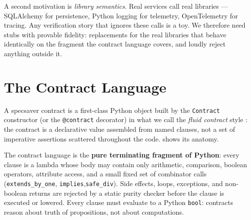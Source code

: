 \documentclass[11pt,a4paper]{article}
\begin{document}
A second motivation is \emph{library semantics}.  Real services call
real libraries --- SQLAlchemy for persistence, Python logging for
telemetry, OpenTelemetry for tracing.  Any verification story that
ignores these calls is a toy.  We therefore need stubs with provable
fidelity: replacements for the real libraries that behave identically
on the fragment the contract language covers, and loudly reject
anything outside it.

\section{The Contract Language}\label{sec:language}

A \textsf{specsaver} contract is a first-class Python object built by
the \texttt{Contract} constructor (or the \texttt{@contract}
decorator) in what we call the \emph{fluid contract} style
\cite{Meyer92,Leino10}: the contract is a declarative value assembled
from named clauses, not a set of imperative assertions scattered
throughout the code.   shows its anatomy.

The contract language is the \textbf{pure terminating fragment of
Python}: every clause is a lambda whose body may contain only
arithmetic, comparison, boolean operators, attribute access, and a
small fixed set of combinator calls (\texttt{extends\_by\_one},
\texttt{implies},\linebreak\texttt{safe\_div}).  Side effects, loops,
exceptions, and non-boolean returns are rejected by a static purity
checker before the clause is executed or lowered.  Every clause must
evaluate to a Python \texttt{bool}: contracts reason about truth of
propositions, not about computations.
\end{document}

